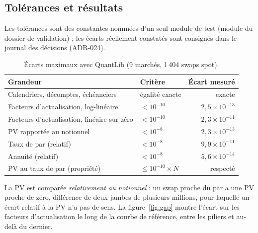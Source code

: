 \documentclass[11pt,a4paper]{article}
\newcommand{\code}[1]{\texttt{\detokenize{#1}}}
\theoremstyle{plain}
\theoremstyle{definition}
\theoremstyle{remark}
\begin{document}
\subsection{Tolérances et résultats}

Les tolérances sont des constantes nommées d'un seul module de test
(module \code{tolerances.py} du dossier de validation) ; les écarts réellement constatés sont consignés dans le
journal des décisions (ADR-024).

\begin{table}[ht]
\centering
\caption{Écarts maximaux avec QuantLib (9 marchés, 1\,404 swaps spot).}\label{tab:validation}
\begin{tabularx}{\linewidth}{@{}>{\raggedright\arraybackslash}X >{\raggedright\arraybackslash}p{3.2cm} r@{}}
\toprule
Grandeur & Critère & Écart mesuré\\
\midrule
Calendriers, décomptes, échéanciers & égalité exacte & exacte\\
Facteurs d'actualisation, log-linéaire & $<10^{-10}$ & $2{,}5\times10^{-13}$\\
Facteurs d'actualisation, linéaire sur zéro & $<10^{-10}$ & $2{,}3\times10^{-11}$\\
PV rapportée au notionnel & $<10^{-8}$ & $2{,}3\times10^{-13}$\\
Taux de par (relatif) & $<10^{-8}$ & $9{,}9\times10^{-11}$\\
Annuité (relatif) & $<10^{-8}$ & $5{,}6\times10^{-14}$\\
PV au taux de par (propriété) & $\le10^{-10}\times N$ & respecté\\
\bottomrule
\end{tabularx}
\end{table}

La PV est comparée \emph{relativement au notionnel} : un swap proche du par a une PV proche de zéro,
différence de deux jambes de plusieurs millions, pour laquelle un écart relatif à la PV n'a pas de
sens. La figure~\ref{fig:gap} montre l'écart sur les facteurs d'actualisation le long de la courbe de
référence, entre les piliers et au-delà du dernier.
\end{document}
